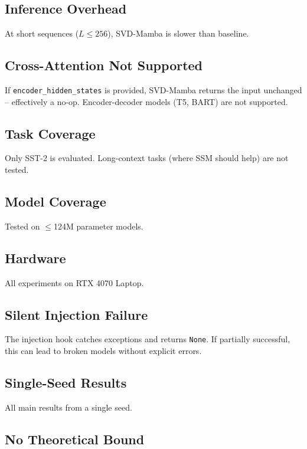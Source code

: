 \subsection{Inference Overhead}

At short sequences ($L \leq 256$), SVD-Mamba is slower than baseline.

\subsection{Cross-Attention Not Supported}

If \texttt{encoder\_hidden\_states} is provided, SVD-Mamba returns the input 
unchanged -- effectively a no-op. Encoder-decoder models (T5, BART) are 
not supported.

\subsection{Task Coverage}

Only SST-2 is evaluated. Long-context tasks (where SSM should help) are 
not tested.

\subsection{Model Coverage}

Tested on $\le$124M parameter models.

\subsection{Hardware}

All experiments on RTX 4070 Laptop.

\subsection{Silent Injection Failure}

The injection hook catches exceptions and returns \texttt{None}. If partially 
successful, this can lead to broken models without explicit errors.

\subsection{Single-Seed Results}

All main results from a single seed.

\subsection{No Theoretical Bound}

